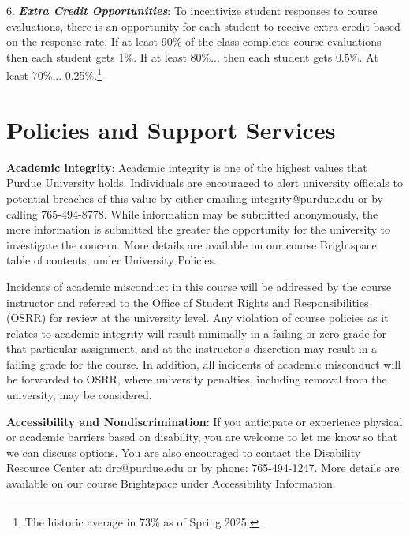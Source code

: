 \documentclass[11pt]{article}
\begin{document}
6. \textbf{\textit{Extra Credit Opportunities}}: To incentivize student responses to course evaluations, there is an opportunity for each student to receive extra credit based on the response rate. If at least 90\% of the class completes course evaluations then each student gets 1\%. If at least 80\%... then each student gets 0.5\%. At least 70\%... 0.25\%.\footnote{The historic average in 73\% as of Spring 2025.} 


\pagebreak




	
	
	
	\section{Policies and Support Services}
	
	\textbf{Academic integrity}: Academic integrity is one of the highest values that Purdue University holds. Individuals are encouraged 
	to alert university officials to potential breaches of this value by either emailing integrity@purdue.edu or 
	by calling 765-494-8778. While information may be submitted anonymously, the more information is 
	submitted the greater the opportunity for the university to investigate the concern. More details are 
	available on our course Brightspace table of contents, under University Policies.
	
	\vspace{0.05in}
	
	Incidents of academic misconduct in this course will be addressed by the course instructor and referred to 
	the Office of Student Rights and Responsibilities (OSRR) for review at the university level. Any 
	violation of course policies as it relates to academic integrity will result minimally in a failing or zero 
	grade for that particular assignment, and at the instructor’s discretion may result in a failing grade for the 
	course. In addition, all incidents of academic misconduct will be forwarded to OSRR, where university 
	penalties, including removal from the university, may be considered.
	
	\bigskip
	
	\textbf{Accessibility and Nondiscrimination}: If you anticipate or experience physical or academic barriers based on disability, you are welcome to let me know so that we can discuss options. You are also encouraged to contact the Disability Resource 
	Center at: drc@purdue.edu or by phone: 765-494-1247. More details are available on our course 
	Brightspace under Accessibility Information.
	
\end{document}
